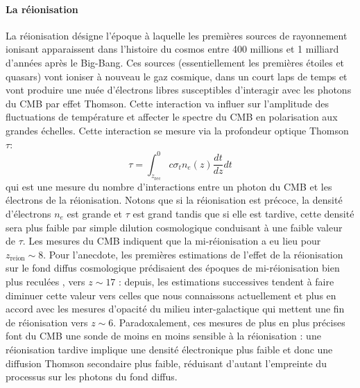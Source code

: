 \paragraph{La réionisation} 
La réionisation désigne l'époque à laquelle les premières sources de rayonnement ionisant apparaissent dans l'histoire du cosmos entre 400 millions et 1 milliard d'années après le Big-Bang. Ces sources (essentiellement les premières étoiles et quasars) vont ioniser à nouveau le gaz cosmique, dans un court laps de temps et vont produire une nuée d'électrons libres susceptibles d'interagir avec les photons du CMB par effet Thomson. Cette interaction va influer sur l'amplitude des fluctuations de température et affecter le spectre du CMB en polarisation aux grandes échelles. Cette interaction se mesure via la profondeur optique Thomson $\tau$:
\begin{equation}
\tau=\int_{z_\mathrm{rec}}^{0} c\sigma_t n_e(z)\frac{dt}{dz}dt
\end{equation}
qui est une mesure du nombre d'interactions entre un photon du CMB et les électrons de la réionisation. Notons que si la réionisation est précoce, la densité d'électrons $n_e$ est grande et $\tau$ est grand tandis que si elle est tardive, cette densité sera plus faible par simple dilution cosmologique conduisant à une faible valeur de $\tau$. Les mesures du CMB indiquent que la mi-réionisation a eu lieu pour $z_\mathrm{reion}\sim8$. Pour l'anecdote, les premières estimations de l'effet de la réionisation sur le fond diffus cosmologique prédisaient des époques de mi-réionisation bien plus reculées , vers $z\sim 17$ : depuis, les estimations successives tendent à faire diminuer cette valeur vers celles que nous connaissons actuellement et plus en accord avec les mesures d'opacité du milieu inter-galactique qui mettent une fin de réionisation vers $z\sim 6$. Paradoxalement, ces mesures de plus en plus précises font du CMB une sonde de moins en moins sensible à la réionisation : une réionisation tardive implique une densité électronique plus faible et donc une diffusion Thomson secondaire plus faible, réduisant d'autant l'empreinte du processus sur les photons du fond diffus.

